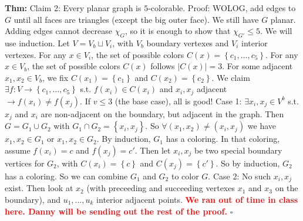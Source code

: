 \documentclass[10pt,letterpaper]{article}
\newcommand{\n}{\hfill\break}
\newcommand{\thm}[1]{\par\noindent\settowidth{\hangindent}{\textbf{Thm: }}\textbf{Thm: }#1\n}
\newcommand{\proven}{\;$\square$\n}
\newcommand{\card}[1]{\left|#1\right|}
\newcommand{\set}[1]{\left\{#1\right\}}
\newcommand{\st}{s.t.}
\newcommand{\flag}[1]{\textbf{\textcolor{red}{#1}}}
\begin{document}
\thm{Claim 2: Every planar graph is $5$-colorable.\n
Proof: WOLOG, add edges to $G$ until all faces are triangles (except the big outer face). We still have $G$ planar. Adding edges cannot decrease $\chi_{G}$, so it is enough to show that $\chi_{G'}\le{}5$. We will use induction.\n
\n
Let $V=V_{b}\sqcup{}V_{i}$, with $V_{b}$ boundary vertexes and $V_{i}$ interior vertexes.\n
For any $x\in{}V_{i}$, the set of possible colors $C(x)=\set{c_{1},\ldots,c_{5}}$.\n
For any $x\in{}V_{b}$, the set of possible colors $C(x)$ follows $\card{C(x)}=3$.\n
For some adjacent $x_{1},x_{2}\in{}V_{b}$, we fix $C(x_{1})=\set{c_{1}}$ and $C(x_{2})=\set{c_{2}}$.\n
We claim $\exists{}f:V\to\set{c_{1},\ldots,c_{5}}$ \st{} $f(x_{i})\in{}C(x_{i})$ and $x_{i},x_{j}$ adjacent $\to{}f(x_{i})\ne{}f(x_{j})$.\n
\n
If $v\le{}3$ (the base case), all is good!\n
Case 1: $\exists{}x_{i},x_{j}\in{}V^{b}$ \st{} $x_{j}$ and $x_{i}$ are non-adjacent on the boundary, but adjacent in the graph.\n
Then $G=G_{1}\cup{}G_{2}$ with $G_{1}\cap{}G_{2}=\set{x_{i},x_{j}}$. So $\forall(x_{1},x_{2})\ne(x_{i},x_{j})$ we have $x_{1},x_{2}\in{}G_{1}$ or $x_{1},x_{2}\in{}G_{2}$. By induction, $G_{1}$ has a coloring. In that coloring, assume $f(x_{i})=c$ and $f(x_{j})=c'$. Then let $x_{i},x_{j}$ be two special boundary vertices for $G_{2}$, with $C(x_{i})=\set{c}$ and $C(x_{j})=\set{c'}$. So by induction, $G_{2}$ has a coloring. So we can combine $G_{1}$ and $G_{2}$ to color $G$.\n
\n
Case 2: No such $x_{i},x_{j}$ exist. Then look at $x_{2}$ (with preceeding and succeeding vertexes $x_{1}$ and $x_{3}$ on the boundary), and $u_{1},\ldots,u_{k}$ interior adjacent points.\n
\flag{We ran out of time in class here. Danny will be sending out the rest of the proof.}\n
\proven}
\end{document}
